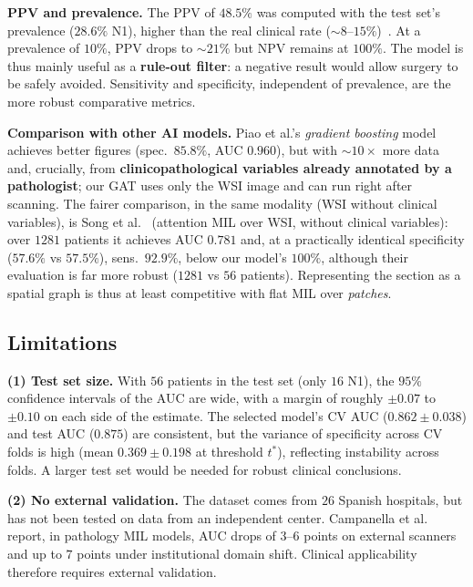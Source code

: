 \documentclass[10pt,a4paper,twocolumn,twoside]{article}
\begin{document}
\textbf{PPV and prevalence.} The PPV of $48.5\%$ was computed with the test set's
prevalence ($28.6\%$ N1), higher than the real clinical rate ($\sim\!8$–$15\%$)~\cite{zaffalon2023}. At a
prevalence of $10\%$, PPV drops to $\sim\!21\%$ but NPV remains at $100\%$. The model
is thus mainly useful as a \textbf{rule-out filter}: a negative result would allow
surgery to be safely avoided. Sensitivity and specificity, independent of prevalence,
are the more robust comparative metrics.

\textbf{Comparison with other AI models.} Piao et al.'s \textit{gradient boosting}
model~\cite{piao2023ai} achieves better figures (spec.\ $85.8\%$, AUC $0.960$), but with
$\sim\!10\!\times$ more data and, crucially, from \textbf{clinicopathological variables already
annotated by a pathologist}; our GAT uses only the WSI image and can run right after
scanning. The fairer comparison, in the same modality (WSI without clinical variables), is Song et
al.~\cite{song2024lnm} (attention MIL over WSI, without clinical variables): over $1281$
patients it achieves AUC $0.781$ and, at a practically identical specificity ($57.6\%$ vs
$57.5\%$), sens.\ $92.9\%$, below our model's $100\%$, although their
evaluation is far more robust ($1281$ vs $56$ patients). Representing the section as a spatial
graph is thus at least competitive with flat MIL over \textit{patches}.

\subsection{Limitations}
\label{sec:limitacions}

\textbf{(1) Test set size.}
With $56$ patients in the test set (only $16$ N1), the $95\%$ confidence intervals of the AUC
are wide, with a margin of roughly $\pm0.07$ to $\pm0.10$ on each side of the estimate. The selected model's CV AUC ($0.862\!\pm\!0.038$)
and test AUC ($0.875$) are consistent, but the variance of specificity across CV folds is high
(mean $0.369\!\pm\!0.198$ at threshold $t^*$), reflecting instability
across folds. A larger test set would be needed for robust clinical conclusions.

\textbf{(2) No external validation.}
The dataset comes from $26$ Spanish hospitals, but has not been tested on data from an
independent center. Campanella et al.~\cite{campanella2019} report, in pathology MIL models,
AUC drops of $3$–$6$ points on external scanners and up to $7$ points under institutional
domain shift. Clinical applicability therefore requires external validation.
\end{document}

